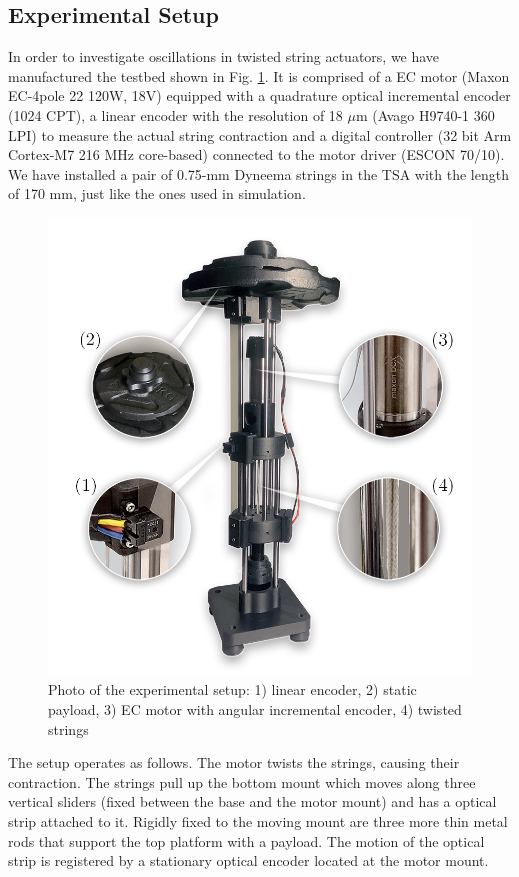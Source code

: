 \subsection{Experimental Setup}
In order to investigate oscillations in twisted string actuators, we have manufactured the testbed shown in Fig.
\ref{fig:ex_setup}. It is comprised of a EC motor (Maxon EC-4pole 22 120W, 18V) equipped with a quadrature optical incremental encoder (1024 CPT), a linear encoder with the resolution of 18 $\mu$m (Avago H9740-1 360 LPI) 
to measure the actual string contraction and a digital controller (32 bit Arm Cortex-M7 216 MHz core-based) 
connected to the motor driver (ESCON 70/10). We have installed a pair of 0.75-mm Dyneema strings in the TSA with the length of 170 mm, just like the ones used in simulation. 

	\begin{figure}
		\centering
		\vspace*{-1mm} 
		\includegraphics[trim= 0.0cm 0.5cm 0.0cm 0.0cm, width=0.8\columnwidth]{pics/linear_setup.png}
		\caption{Photo of the experimental setup:  1) linear encoder, 2) static payload, 3) EC motor with angular incremental encoder, 4) twisted strings  }
		\label{fig:ex_setup}
		\vspace*{-4mm} 
	\end{figure}

The setup operates as follows. The motor twists the strings, causing their contraction. The strings pull up the bottom mount which moves along three vertical sliders (fixed between the base and the motor mount) and has a optical strip attached to it. Rigidly fixed to the moving mount are three more thin metal rods that support the top platform with a payload. The motion of the optical strip is registered by a stationary optical encoder located at the motor mount.

